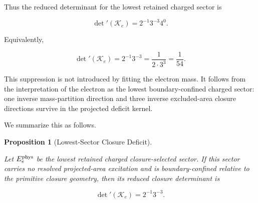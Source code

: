 \documentclass[11pt]{article}
\newtheorem{proposition}[theorem]{Proposition}
\theoremstyle{definition}
\theoremstyle{remark}
\begin{document}
Thus the reduced determinant for the lowest retained charged
sector is

\begin{equation}
\det{}'(\mathcal K_e) =
2^{-1}3^{-3}4^{0}.
\label{eq:electron_closure_deficit}
\end{equation}

Equivalently,

\begin{equation}
\det{}'(\mathcal K_e)
=
2^{-1}3^{-3}
=
\frac{1}{2\cdot 3^3}
=
\frac{1}{54}.
\label{eq:electron_determinant}
\end{equation}

This suppression is not introduced by fitting the electron mass.
It follows from the interpretation of the electron as the lowest
boundary-confined charged sector: one inverse mass-partition
direction and three inverse excluded-area closure directions
survive in the projected deficit kernel.

We summarize this as follows.

\begin{proposition}[Lowest-Sector Closure Deficit]
\label{prop:lowest_sector_deficit}

Let \(E_e^{\rm phys}\) be the lowest retained charged
closure-selected sector. If this sector carries no resolved
projected-area excitation and is boundary-confined relative to
the primitive closure geometry, then its reduced closure
determinant is

\begin{equation}
\det{}'(\mathcal K_e) =
2^{-1}3^{-3}.
\end{equation}

\end{proposition}
\end{document}
